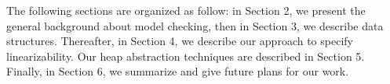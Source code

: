 The following sections are organized as follow: in Section 2, we present the general background about model checking, then in Section 3, we describe data structures. Thereafter, in Section 4, we describe our approach to specify linearizability.  Our heap abstraction techniques are described in Section 5. Finally, in Section 6, we summarize and give future plans for our work.

